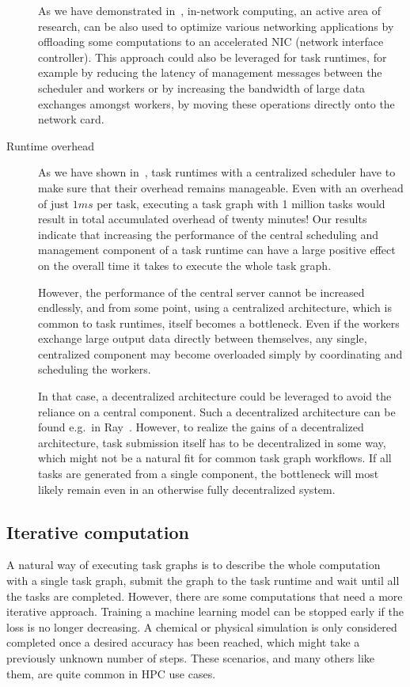 \begin{description}
    As we have demonstrated in~\cite{spin, spin2}, in-network computing, an active area of
    research, can be also used to optimize various networking applications by offloading some
    computations to an accelerated NIC (network interface controller). This approach could also
    be leveraged for task runtimes, for example by reducing the latency of management messages
    between the scheduler and workers or by increasing the bandwidth of large data exchanges
    amongst workers, by moving these operations directly onto the network card.
    \item[Runtime overhead] As we have shown in~\cite{rsds}, task runtimes with a centralized
    scheduler have to make sure that their overhead remains manageable. Even with an overhead of
    just $1ms$ per task, executing a task graph with 1 million tasks would result in total
    accumulated overhead of twenty minutes! Our results indicate that increasing the performance
    of the central scheduling and management component of a task runtime can have a large positive
    effect on the overall time it takes to execute the whole task graph.

    However, the performance of the central server cannot be increased endlessly, and from some
    point, using a centralized architecture, which is common to task runtimes, itself becomes a
    bottleneck. Even if the workers exchange large output data directly between themselves, any
    single, centralized component may become overloaded simply by coordinating and scheduling
    the workers.

    In that case, a decentralized architecture could be leveraged to avoid the reliance on a
    central component. Such a decentralized architecture can be found e.g.\ in Ray~\cite{ray}.
    However, to realize the gains of a decentralized architecture, task submission itself has to
    be decentralized in some way, which might not be a natural fit for common task graph workflows.
    If all tasks are generated from a single component, the bottleneck will most likely remain
    even in an otherwise fully decentralized system.
\end{description}

\subsection{Iterative computation}
A natural way of executing task graphs is to describe the whole computation with a single task
graph, submit the graph to the task runtime and wait until all the tasks are completed. However,
there are some computations that need a more iterative approach. Training a machine
learning model can be stopped early if the loss is no longer decreasing. A chemical or physical
simulation is only considered completed once a desired accuracy has been reached, which might
take a previously unknown number of steps. These scenarios, and many others like them, are quite
common in HPC use cases.

